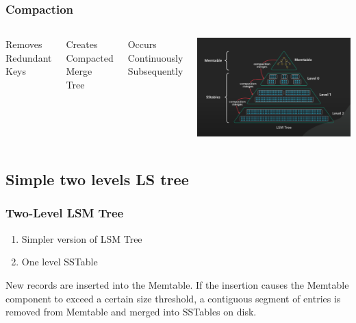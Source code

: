 \documentclass[
	11pt, 
]{beamer}
\begin{document}
\begin{frame}
    \frametitle{Compaction}
    \begin{columns}
            \begin{tcolorbox}[colback=white, colframe=blue!50!black, arc=4mm]
                Removes Redundant Keys
            \end{tcolorbox}
            \begin{tcolorbox}[colback=white, colframe=blue!50!black, arc=4mm]
                Creates Compacted Merge Tree
            \end{tcolorbox}
            \begin{tcolorbox}[colback=white, colframe=blue!50!black, arc=4mm]
                Occurs Continuously Subsequently
            \end{tcolorbox}
             \includegraphics[scale=0.23]{Compaction.png}
    \end{columns} 
    
\end{frame}

\subsection{Simple two levels LS tree}

\begin{frame}
    \frametitle{Two-Level LSM Tree}
    \begin{enumerate}
        \item Simpler version of LSM Tree
        \item One level SSTable
    \end{enumerate}
    \bigskip
    New records are inserted into the Memtable. If the insertion causes the Memtable component to exceed a certain size threshold, a contiguous segment of entries is removed from Memtable and merged into SSTables on disk. 
\end{frame}
\end{document}

